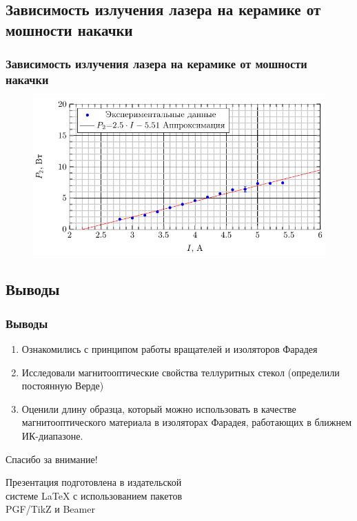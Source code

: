 \documentclass[10pt,pdf,hyperref={unicode}, dvipsnames]{beamer}
\newcommand\frametitless[1]{\subsection{#1}\frametitle{#1}}
\begin{document}
\begin{frame}[t]
	\frametitless{Зависимость излучения лазера на керамике от мошности накачки}
		\begin{figure}[tb]
		\centering
		\includegraphics[]{img/P2I}
	\end{figure}
\end{frame}
\begin{frame}
	\frametitless{Выводы}
	\begin{enumerate} 
		\item 
			  Ознакомились с принципом работы вращателей и изоляторов Фарадея
		\item 
		      Исследовали магнитооптические свойства теллуритных стекол (определили постоянную Верде)
		\item 
		      Оценили длину образца, который можно использовать в качестве магнитооптического материала в изоляторах Фарадея, работающих в ближнем ИК-диапазоне.
	\end{enumerate}
\end{frame}


\begin{frame}[plain]
	\vspace{4cm}
	\begin{center}
		\Huge
		Спасибо за внимание!
	\end{center}
	\vspace{2.5cm}
	\begin{center}
		\color{black!30!white}
		Презентация подготовлена в издательской \\
		системе LaTeX с использованием пакетов \\
		PGF/TikZ и Beamer
	\end{center}
\end{frame}
\end{document}
